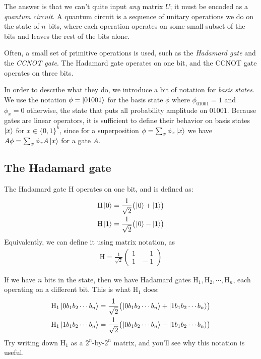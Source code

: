 The answer is that we can't quite input \emph{any} matrix $U$; it must be encoded as a \emph{quantum circuit}.
A quantum circuit is a sequence of unitary operations we do on the state of $n$ bits, where each operation operates on some small subset of the bits and leaves the rest of the bits alone.

Often, a small set of primitive operations is used, such as the \emph{Hadamard gate} and the \emph{CCNOT gate}.
The Hadamard gate operates on one bit, and the CCNOT gate operates on three bits.

In order to describe what they do, we introduce a bit of notation for \emph{basis states}.
We use the notation $\phi = \ket{01001}$ for the basis state $\phi$ where $\phi_{01001} = 1$ and $\phi_x = 0$ otherwise, \ie the state that puts all probability amplitude on $01001$.
Because gates are linear operators, it is sufficient to define their behavior on basis states $\ket{x}$ for $x \in \{0,1\}^k$,
since for a superposition $\phi = \sum_x \phi_x \ket{x}$ we have $A\phi = \sum_x \phi_x A \ket{x}$ for a gate $A$.

\subsection{The Hadamard gate}

\newcommand{\Ha}{\mathrm{H}}
\newcommand{\CCNOT}{\mathrm{CCNOT}}
\newcommand{\kets}[1]{\big(\kern-0.1em #1\!\big)}

The Hadamard gate $\Ha$ operates on one bit, and is defined as:
\begin{align*}
  \Ha\ket{0} = \frac{1}{\sqrt{2}}\kets{\ket{0} + \ket{1}} \\
  \Ha\ket{1} = \frac{1}{\sqrt{2}}\kets{\ket{0} - \ket{1}}
\end{align*}
Equivalently, we can define it using matrix notation, as
\begin{align*}
  \Ha = \frac{1}{\sqrt{2}}\begin{pmatrix}
    1 & \!\!\!\phantom{-}1 \\
    1 & \!\!\!-1
  \end{pmatrix}
\end{align*}

If we have $n$ bits in the state, then we have Hadamard gates $\Ha_1, \Ha_2, \cdots, \Ha_n$, each operating on a different bit.
This is what $\Ha_1$ does:
\begin{align}
  \Ha_1 \ket{0 b_1 b_2 \cdots b_n} = \frac{1}{\sqrt{2}}\kets{\ket{0 b_1 b_2 \cdots b_n} + \ket{1 b_1 b_2 \cdots b_n}} \label{eqn:hadamard}\\
  \Ha_1 \ket{1 b_1 b_2 \cdots b_n} = \frac{1}{\sqrt{2}}\kets{\ket{0 b_1 b_2 \cdots b_n} - \ket{1 b_1 b_2 \cdots b_n}}
\end{align}
Try writing down $\Ha_1$ as a $2^n$-by-$2^n$ matrix, and you'll see why this notation is useful.

